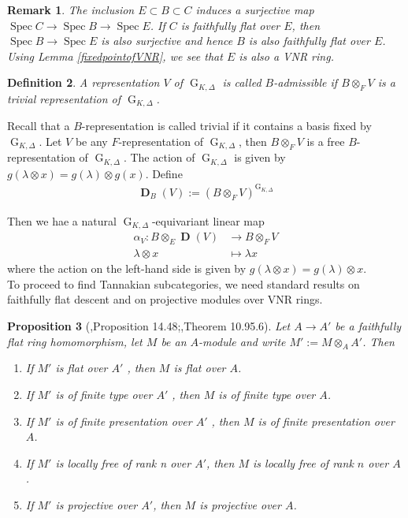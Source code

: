 \documentclass{amsart}
\newtheorem{proposition}{Proposition}[section]
\newtheorem{remark}[proposition]{Remark}
\newtheorem{definition}[proposition]{Definition}
\DeclareMathOperator{\spec}{Spec}
\DeclareMathOperator{\G}{G}
\DeclareMathOperator{\bD}{\textbf{D}}
\begin{document}
\begin{remark}
    The inclusion $E\subset B\subset C$ induces a surjective map $\spec C\to \spec B\to \spec E$. If $C$ is faithfully flat over $E$, then $\spec B\to\spec E$ is also surjective and hence $B$ is also faithfully flat over $E$. Using Lemma \ref{fixedpointofVNR}, we see that $E$ is also a VNR ring.
\end{remark}

\begin{definition}
    A representation $V$ of $\G_{K,\Delta}$ is called \emph{$B$-admissible} if $B\otimes_F V$ is a trivial representation of $\G_{K,\Delta}$.
\end{definition}

Recall that a $B$-representation is called trivial if it contains a basis fixed by $\G_{K,\Delta}$. Let $V$ be any $F$-representation of $\G_{K,\Delta}$, then $B\otimes_F V$ is a free $B$-representation of $\G_{K,\Delta}$. The action of $\G_{K,\Delta}$ is given by $g(\lambda\otimes x)=g(\lambda)\otimes g(x)$. Define
\begin{align*}
    \bD_B(V):=(B\otimes_F V)^{\G_{K,\Delta}}
\end{align*}

Then we hae a natural $\G_{K,\Delta}$-equivariant linear map
\begin{align*}
    \alpha_V: B\otimes_E\bD(V)&\to B\otimes_F V\\
            \lambda\otimes x  &\mapsto \lambda x
\end{align*}
where the action on the left-hand side is given by $g(\lambda\otimes x)=g(\lambda)\otimes x$.\\

To proceed to find Tannakian subcategories, we need standard results on faithfully flat descent and on projective modules over VNR rings.

\begin{proposition}[\cite{Wed-Gor},Proposition 14.48;\cite{stacks-project},Theorem 10.95.6]\label{Faithfully Flat Descent of Modules} Let $A\to A'$ be a faithfully flat ring homomorphism, let $M$ be an $A$-module and write $M':= M \otimes_A A'$. Then
\begin{enumerate}
    \item[(i)] If $M'$ is flat over $A'$ , then $M$ is flat over $A$.
    \item[(ii)] If $M'$ is of finite type over $A'$ , then $M$ is of finite type over $A$.
    \item[(iii)] If $M'$ is of finite presentation over $A'$ , then $M$ is of finite presentation over $A$.
    \item[(iv)] If $M'$ is locally free of rank n over $A'$, then $M$ is locally free of rank $n$ over $A$.
    \item[(v)] If $M'$ is projective over $A'$, then $M$ is projective over $A$.
\end{enumerate}
\end{proposition}
\end{document}
